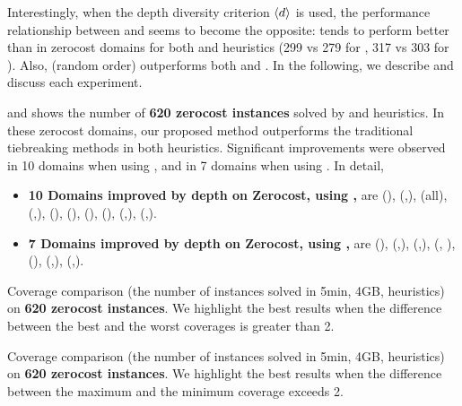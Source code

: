 Interestingly, when the depth diversity criterion ${\left<d\right>}$ is used, 
the performance relationship between \lifo and \fifo seems to become the opposite:
\fifo tends to perform better than \lifo in zerocost domains for both
\lmcut and \mands heuristics (299 vs 279 for \lmcut, 317 vs 303 for \mands).
Also, \ro (random order) outperforms both \fifo and \lifo.
In the following, we describe and discuss each experiment.

 and  shows the number of \textbf{620 zerocost
instances} solved by \lmcut and \mands heuristics. In these
zerocost domains, our proposed method outperforms the traditional tiebreaking methods in both heuristics.
Significant improvements were observed in 10 domains when using \lmcut, and in 7 domains when using \mands.
In detail,
\begin{itemize}
 \item \textbf{10 Domains improved by depth on Zerocost, using \lmcut,} are  (\ro),  (\fifo,\ro),
        (all),  (\fifo,\ro),  (\ro),  (\ro),
        (\lifo),  (\fifo),  (\fifo,\ro),  (\fifo,\ro).
 \item \textbf{7 Domains improved by depth on Zerocost, using \mands,} are  (\ro),  (\fifo,\ro),
        (\fifo,\ro),  (\fifo, \ro),  (\ro),
        (\fifo,\ro),  (\fifo,\ro).
\end{itemize}


\begin{table}[htbp]
 {
 \centering
 
  \caption{ Coverage comparison (the number of instances solved in 5min, 4GB, \lmcut heuristics) on \textbf{620
 zerocost instances}.  We highlight the best results when the difference between the best and the worst coverages
 is greater than 2.  }
 \label{tbl:lmcut-zerocost-full}}
\end{table}

\begin{table}[htbp]
 {
 \centering
 
  \caption{
 Coverage comparison (the number of instances solved in 5min, 4GB, \mands heuristics)
 on \textbf{620 zerocost instances}. We highlight the
 best results when the difference between the maximum and the minimum coverage exceeds 2.
 }
 \label{tbl:mands-zerocost-full}
 }
\end{table}

